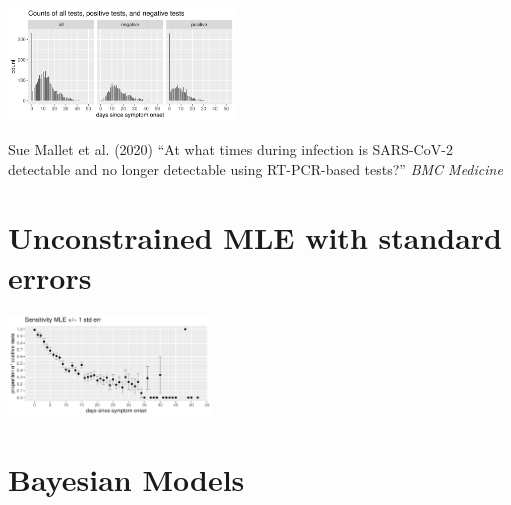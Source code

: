 \documentclass[plainboxedsections]{sciposter}
\begin{document}
\begin{multicols}{2}
\begin{center}
  \includegraphics[width=0.45\textwidth]{img/data-counts.pdf}
\end{center}

{\small Sue Mallet et al. (2020) ``At what times during infection is SARS-CoV-2 detectable and no longer detectable using RT-PCR-based tests?'' {\slshape BMC Medicine}}

\section{Unconstrained MLE with standard errors}


\begin{center}
\includegraphics[width=0.4\textwidth]{img/mle.pdf}
\end{center}

\columnbreak

\section{Bayesian Models}
\newcommand{\ilogit}{\textrm{logit}^{-1}}


\end{multicols}
\end{document}
